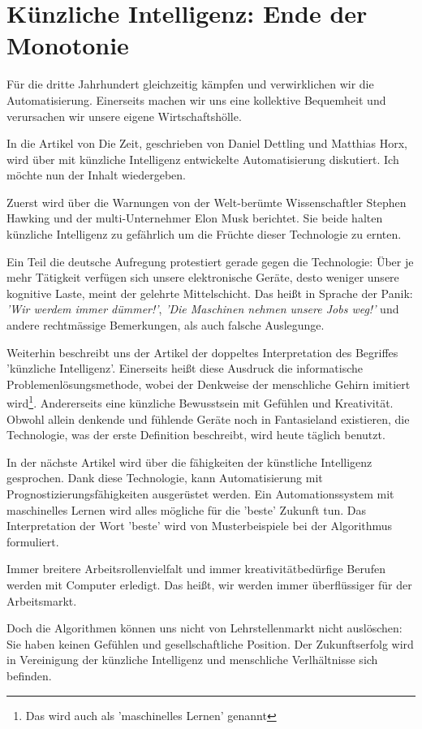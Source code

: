 \documentclass[../Mappe.tex]{subfiles}
\begin{document}
\section[Künzliche Intelligenz: Ende der Monotonie]{Künzliche Intelligenz: Ende der Monotonie \cite{zeitki}}

Für die dritte Jahrhundert gleichzeitig kämpfen und verwirklichen wir die Automatisierung.
Einerseits machen wir uns eine kollektive Bequemheit und verursachen wir unsere eigene Wirtschaftshölle.

In die Artikel von Die Zeit, geschrieben von Daniel Dettling und Matthias Horx, wird über mit künzliche Intelligenz
entwickelte Automatisierung diskutiert.
Ich möchte nun der Inhalt wiedergeben.

Zuerst wird über die Warnungen von der Welt-berümte Wissenschaftler Stephen Hawking und der multi-Unternehmer Elon Musk berichtet.
Sie beide halten künzliche Intelligenz zu gefährlich um die Früchte dieser Technologie zu ernten.

Ein Teil die deutsche Aufregung protestiert gerade gegen die Technologie: 
Über je mehr Tätigkeit verfügen sich unsere elektronische Geräte, desto weniger unsere kognitive Laste, meint der gelehrte Mittelschicht.
Das heißt in Sprache der Panik: \emph{'Wir werdem immer dümmer!'}, \emph{'Die Maschinen nehmen unsere Jobs weg!'}
und andere rechtmässige Bemerkungen, als auch falsche Auslegunge.

Weiterhin beschreibt uns der Artikel der doppeltes Interpretation des Begriffes 'künzliche Intelligenz'.
Einerseits heißt diese Ausdruck die informatische Problemenlösungsmethode, wobei der Denkweise der menschliche Gehirn imitiert wird\footnote{Das wird auch als 'maschinelles Lernen' genannt}.
Andererseits eine künzliche Bewusstsein mit Gefühlen und Kreativität.
Obwohl allein denkende und fühlende Geräte noch in Fantasieland existieren, die Technologie, was der erste Definition beschreibt, wird heute täglich benutzt. 

In der nächste Artikel wird über die fähigkeiten der künstliche Intelligenz gesprochen.
Dank diese Technologie, kann Automatisierung mit Prognostizierungsfähigkeiten ausgerüstet werden.
Ein Automationssystem mit maschinelles Lernen wird alles mögliche für die 'beste' Zukunft tun.
Das Interpretation der Wort 'beste' wird von Musterbeispiele bei der Algorithmus formuliert.

Immer breitere Arbeitsrollenvielfalt und immer kreativitätbedürfige Berufen werden mit Computer erledigt.
Das heißt, wir werden immer überflüssiger für der Arbeitsmarkt.

Doch die Algorithmen können uns nicht von Lehrstellenmarkt nicht auslöschen:
Sie haben keinen Gefühlen und gesellschaftliche Position.
Der Zukunftserfolg wird in Vereinigung der künzliche Intelligenz und menschliche Verlhältnisse sich befinden.
\end{document}

